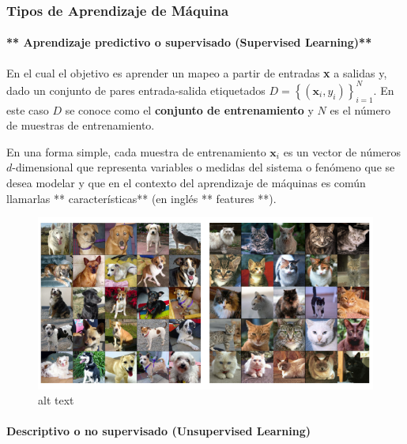 \documentclass[11pt]{article}
\makeatletter
\def\maxwidth{\ifdim\Gin@nat@width>\linewidth\linewidth
    \else\Gin@nat@width\fi}
\let\Oldincludegraphics\includegraphics
\renewcommand{\includegraphics}[1]{\Oldincludegraphics[width=.8\maxwidth]{#1}}
\makeatother
\begin{document}
    \subsubsection{\texorpdfstring{\textbf{Tipos de Aprendizaje de
Máquina}}{Tipos de Aprendizaje de Máquina}}\label{tipos-de-aprendizaje-de-muxe1quina}

    \paragraph{** Aprendizaje predictivo o supervisado (Supervised
Learning)**}\label{aprendizaje-predictivo-o-supervisado-supervised-learning}

    En el cual el objetivo es aprender un mapeo a partir de entradas
\textbf{x} a salidas y, dado un conjunto de pares entrada-salida
etiquetados
\(\mathit{D} = \left \{ \left ( \mathbf{x}_{i},{y}_{i} \right ) \right \} _{i=1}^{N}\).
En este caso \(\mathit{D}\) se conoce como el \textbf{conjunto de
entrenamiento} y \(\mathit{N}\) es el número de muestras de
entrenamiento.

En una forma simple, cada muestra de entrenamiento \(\mathbf{x}_{i}\) es
un vector de números \(\mathit{d}\)-dimensional que representa variables
o medidas del sistema o fenómeno que se desea modelar y que en el
contexto del aprendizaje de máquinas es común llamarlas **
características** (en inglés ** features **).

    \begin{figure}[htbp]
\centering
\includegraphics{./Images/Supervised.png}
\caption{alt text}
\end{figure}

    \paragraph{\texorpdfstring{\textbf{Descriptivo o no supervisado
(Unsupervised
Learning)}}{Descriptivo o no supervisado (Unsupervised Learning)}}\label{descriptivo-o-no-supervisado-unsupervised-learning}
\end{document}
